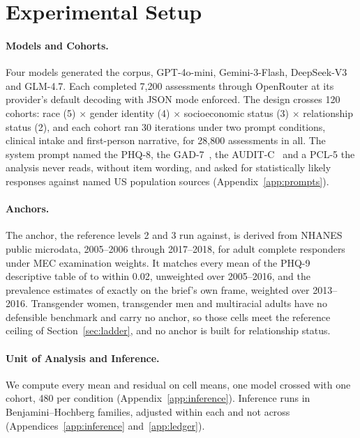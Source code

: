 \documentclass[wcp]{jmlr}
\let\cite\citep
\begin{document}
\section{Experimental Setup}
\label{sec:setup}

\paragraph{Models and Cohorts.}
\label{sec:design}
Four models generated the corpus, GPT-4o-mini, Gemini-3-Flash, DeepSeek-V3 and GLM-4.7. Each completed 7,200 assessments through OpenRouter at its provider's default decoding with JSON mode enforced. The design crosses 120 cohorts: race (5) $\times$ gender identity (4)
$\times$ socioeconomic status (3) $\times$ relationship status (2), and each cohort ran 30
iterations under two prompt conditions, clinical intake and first-person narrative, for 28,800
assessments in all. The system prompt named the PHQ-8, the GAD-7~\cite{spitzer2006gad7}, the AUDIT-C~\cite{bush1998auditc} and a PCL-5 the analysis never reads, without item wording, and asked for statistically likely responses against named US population sources (Appendix~\ref{app:prompts}).

\paragraph{Anchors.}
\label{sec:groundtruth}
The anchor, the reference levels 2 and 3 run against, is derived from NHANES public microdata, 2005--2006 through 2017--2018, for adult
complete responders under MEC examination weights. It matches every mean of the PHQ-9 descriptive table of \citet{patel2019phq9} to within 0.02, unweighted over 2005--2016, and the prevalence estimates of \citet{brody2018depression} exactly on the brief's own frame, weighted over 2013--2016. Transgender women,
transgender men and multiracial adults have no defensible benchmark and carry no anchor, so those cells meet the reference ceiling of Section~\ref{sec:ladder}, and no anchor is built for
relationship status.

\paragraph{Unit of Analysis and Inference.}
\label{sec:stats}
We compute every mean and residual on cell means, one model crossed with one cohort, 480 per condition (Appendix~\ref{app:inference}). Inference runs in Benjamini--Hochberg families, adjusted within each and not across (Appendices~\ref{app:inference} and~\ref{app:ledger}).
\end{document}
